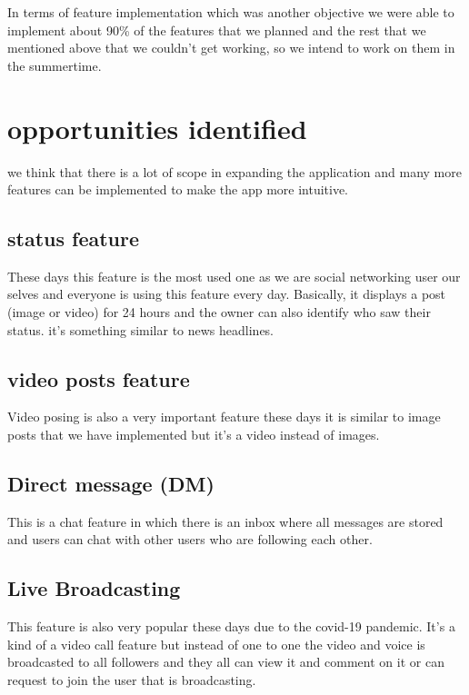 In terms of feature implementation which was another objective we were able to implement about 90\% of the features that we planned and the rest that we mentioned above that we couldn't get working, so we intend to work on them in the summertime.

\section{opportunities identified}
we think that there is a lot of scope in expanding the application and many more features can be implemented to make the app more intuitive.
\subsection{status feature}
These days this feature is the most used one as we are social networking user our selves and everyone is using this feature every day. Basically, it displays a post (image or video) for 24 hours and the owner can also identify who saw their status. it's something similar to news headlines.
\subsection{video posts feature}
Video posing is also a very important feature these days it is similar to image posts that we have implemented but it's a video instead of images.
\subsection{Direct message (DM)}
This is a chat feature in which there is an inbox where all messages are stored and users can chat with other users who are following each other.
\subsection{Live Broadcasting}
This feature is also very popular these days due to the covid-19 pandemic. It's a kind of a video call feature but instead of one to one the video and voice is broadcasted to all followers and they all can view it and comment on it or can request to join the user that is broadcasting.

